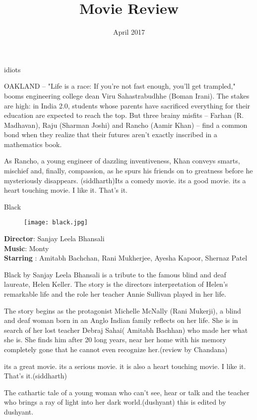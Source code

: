 \documentclass{article}
\title{Movie Review}
\date{April 2017}
\begin{document}
 idiots

OAKLAND -- "Life is a race: If you're not fast enough, you'll get trampled," booms engineering college dean Viru Sahastrabudhhe (Boman Irani). The stakes are high: in India 2.0, students whose parents have sacrificed everything for their education are expected to reach the top. But three brainy misfits -- Farhan (R. Madhavan), Raju (Sharman Joshi) and Rancho (Aamir Khan) -- find a common bond when they realize that their futures aren't exactly inscribed in a mathematics book.

As Rancho, a young engineer of dazzling inventiveness, Khan conveys smarts, mischief and, finally, compassion, as he spurs his friends on to greatness before he mysteriously disappears.
(siddharth)Its a comedy movie. its a good movie. its a heart touching movie. I like it. That's it. 


  


\maketitle
Black\\
\begin{figure}[h!]
  \texttt{[image: black.jpg]}
\end{figure}
\begin{flushleft}
\textsf{\textbf{Director}: Sanjay Leela Bhansali\\ 
        \textbf{Music}: Monty\\
        \textbf{Starring} : Amitabh Bachchan, Rani Mukherjee, Ayesha Kapoor, Shernaz Patel}\\
\end{flushleft}  
                           
         \vspace{2mm}
Black by Sanjay Leela Bhansali is a tribute to the famous blind and deaf laureate, Helen Keller. The story is the directors interpretation of Helen's remarkable life and the role her teacher Annie Sullivan played in her life.
\par
The story begins as the protagonist Michelle McNally (Rani Mukerji), a blind and deaf woman born in an Anglo Indian family reflects on her life. She is in search of her lost teacher Debraj Sahai( Amitabh Bachhan) who made her what she is. She finds him after 20 long years, near her home with his memory completely gone that he cannot even recognize her.(review by Chandana)
\par
its a great movie. its a serious movie. it is also a heart touching movie. I like it. That's it.(siddharth)

\par
The cathartic tale of a young woman who can't see, hear or talk and the teacher who brings a ray of light into her dark world.(dushyant)
this is edited by dushyant. 
\end{document}
